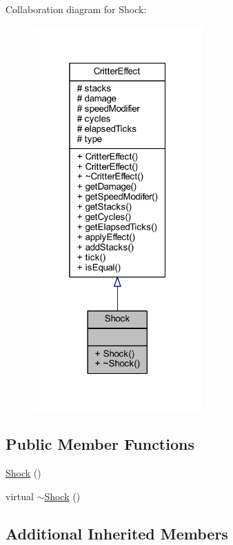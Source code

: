 Collaboration diagram for Shock\+:
\nopagebreak
\begin{figure}[H]
\begin{center}
\leavevmode
\includegraphics[width=184pt]{struct_shock__coll__graph}
\end{center}
\end{figure}
\subsection*{Public Member Functions}
\begin{DoxyCompactItemize}
\item 
\hyperlink{struct_shock_afe9b71a9604186d22eb1db2ac710f1b6}{Shock} ()
\item 
virtual \hyperlink{struct_shock_a6917332489870e66f66ceb4e9cb44dd2}{$\sim$\+Shock} ()
\end{DoxyCompactItemize}
\subsection*{Additional Inherited Members}


